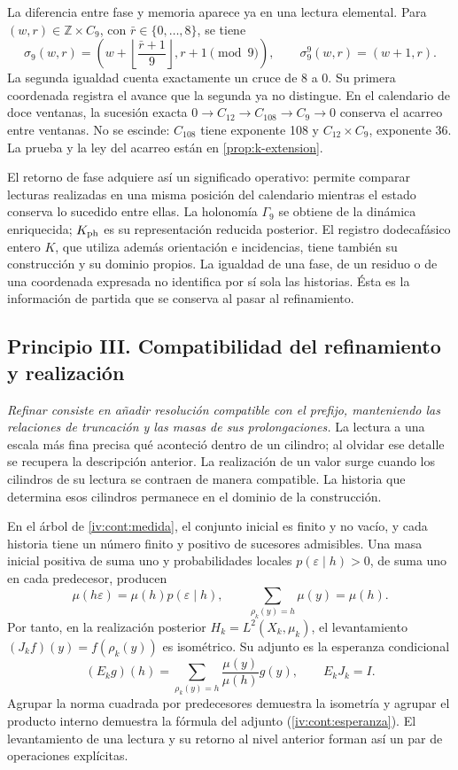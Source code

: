 La diferencia entre fase y memoria aparece ya en una lectura elemental.
Para \((w,r)\in\mathbb Z\times C_9\), con
\(\bar r\in\{0,\ldots,8\}\), se tiene
\[
 \sigma_9(w,r)=
 \left(w+\left\lfloor\frac{\bar r+1}{9}\right\rfloor,
       r+1\pmod9\right),\qquad
 \sigma_9^9(w,r)=(w+1,r).
\]
La segunda igualdad cuenta exactamente un cruce de 8 a 0. Su primera
coordenada registra el avance que la segunda ya no distingue. En el
calendario de doce ventanas, la sucesión exacta
\(0\to C_{12}\to C_{108}\to C_9\to0\) conserva el acarreo entre
ventanas. No se escinde: \(C_{108}\) tiene exponente 108 y
\(C_{12}\times C_9\), exponente 36. La prueba y la ley del acarreo están
en \cref{prop:k-extension}.

El retorno de fase adquiere así un significado operativo: permite
comparar lecturas realizadas en una misma posición del calendario mientras
el estado conserva lo sucedido entre ellas. La holonomía \(\Gamma_9\)
se obtiene de la dinámica enriquecida; \(K_{\rm ph}\) es su representación
reducida posterior. El registro dodecafásico entero \(K\), que utiliza
además orientación e incidencias, tiene también su construcción y su dominio
propios. La igualdad de una fase, de un residuo o de una coordenada expresada
no identifica por sí sola las historias. Ésta es la información de partida
que se conserva al pasar al refinamiento.

\subsection*{Principio III. Compatibilidad del refinamiento y realización}
\hypertarget{prinh:refinamiento}{}

\emph{Refinar consiste en añadir resolución compatible con el prefijo,
manteniendo las relaciones de truncación y las masas de sus prolongaciones.}
La lectura a una escala más fina precisa qué aconteció dentro de un
cilindro; al olvidar ese detalle se recupera la descripción anterior.
La realización de un valor surge cuando los cilindros de su lectura se
contraen de manera compatible. La historia que determina esos cilindros
permanece en el dominio de la construcción.

En el árbol de \cref{iv:cont:medida}, el conjunto inicial es finito y no
vacío, y cada historia tiene un número finito y positivo de sucesores
admisibles. Una masa inicial positiva de suma uno y probabilidades locales
\(p(\varepsilon\mid h)>0\), de suma uno en cada predecesor, producen
\[
 \mu(h\varepsilon)=\mu(h)p(\varepsilon\mid h),\qquad
 \sum_{\rho_k(y)=h}\mu(y)=\mu(h).
\]
Por tanto, en la realización posterior
\(H_k=L^2(X_k,\mu_k)\), el levantamiento
\((J_kf)(y)=f(\rho_k(y))\) es isométrico. Su adjunto es la esperanza
condicional
\[
 (E_kg)(h)=\sum_{\rho_k(y)=h}
                  \frac{\mu(y)}{\mu(h)}g(y),
 \qquad E_kJ_k=I.
\]
Agrupar la norma cuadrada por predecesores demuestra la isometría y agrupar el
producto interno demuestra la fórmula del adjunto
(\cref{iv:cont:esperanza}). El levantamiento de una lectura y su retorno
al nivel anterior forman así un par de operaciones explícitas.

